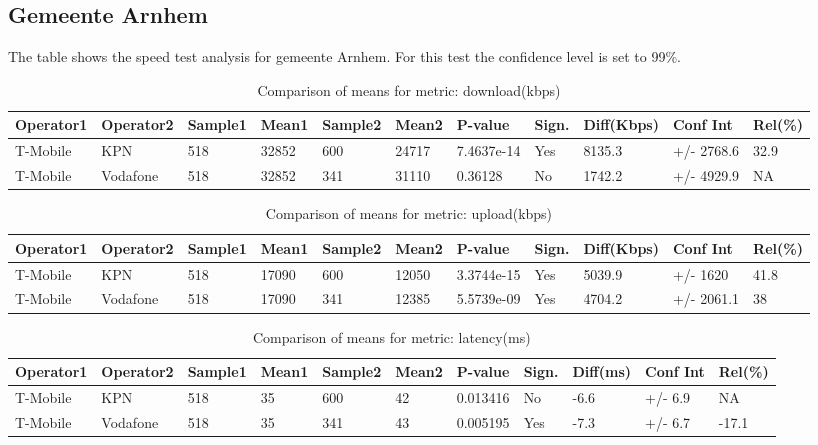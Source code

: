 \documentclass[]{article}
\begin{document}
\normalsize

\newpage

\subsection{Gemeente Arnhem}\label{gemeente-arnhem}

The table shows the speed test analysis for gemeente Arnhem. For this
test the confidence level is set to 99\%.

\begin{table}[ht]
\centering
{\footnotesize
\begin{tabular}{lllllllllll}
  \hline
Operator1 & Operator2 & Sample1 & Mean1 & Sample2 & Mean2 & P-value & Sign. & Diff(Kbps) & Conf Int & Rel(\%) \\ 
  \hline
T-Mobile & KPN & 518 & 32852 & 600 & 24717 & 7.4637e-14 & Yes & 8135.3 & +/- 2768.6 & 32.9 \\ 
  T-Mobile & Vodafone & 518 & 32852 & 341 & 31110 & 0.36128 & No & 1742.2 & +/- 4929.9 & NA \\ 
   \hline
\end{tabular}
}
\caption{Comparison of means for metric: download(kbps)} 
\end{table}\begin{table}[ht]
\centering
{\footnotesize
\begin{tabular}{lllllllllll}
  \hline
Operator1 & Operator2 & Sample1 & Mean1 & Sample2 & Mean2 & P-value & Sign. & Diff(Kbps) & Conf Int & Rel(\%) \\ 
  \hline
T-Mobile & KPN & 518 & 17090 & 600 & 12050 & 3.3744e-15 & Yes & 5039.9 & +/- 1620 & 41.8 \\ 
  T-Mobile & Vodafone & 518 & 17090 & 341 & 12385 & 5.5739e-09 & Yes & 4704.2 & +/- 2061.1 & 38 \\ 
   \hline
\end{tabular}
}
\caption{Comparison of means for metric: upload(kbps)} 
\end{table}\begin{table}[ht]
\centering
{\footnotesize
\begin{tabular}{lllllllllll}
  \hline
Operator1 & Operator2 & Sample1 & Mean1 & Sample2 & Mean2 & P-value & Sign. & Diff(ms) & Conf Int & Rel(\%) \\ 
  \hline
T-Mobile & KPN & 518 & 35 & 600 & 42 & 0.013416 & No & -6.6 & +/- 6.9 & NA \\ 
  T-Mobile & Vodafone & 518 & 35 & 341 & 43 & 0.005195 & Yes & -7.3 & +/- 6.7 & -17.1 \\ 
   \hline
\end{tabular}
}
\caption{Comparison of means for metric: latency(ms)} 
\end{table}
\end{document}
